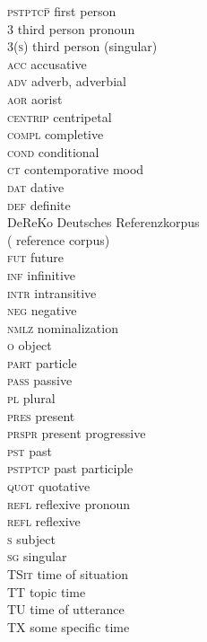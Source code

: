 \documentclass[output=paper,hidelinks]{langscibook}
\begin{document}
\begin{multicols}{2}
\begin{tabbing}
\textsc{pstptcp}\hspace{1ex}\=    \> first person \\
3 \> third person pronoun \\
3(\textsc{s}) \> third person (singular) \\
\textsc{acc} \> accusative \\
\textsc{adv}\> adverb, adverbial \\ 
\textsc{aor}\> aorist \\ 
\textsc{centrip} \> centripetal \\
\textsc{compl} \> completive\\
\textsc{cond}\> conditional\\
\textsc{ct} \> contemporative mood\\
\textsc{dat} \> dative\\
\textsc{def} \> definite\\
DeReKo\> Deutsches Referenzkorpus \\ \> ( reference corpus)\\
\textsc{fut} \> future \\
\textsc{inf} \> infinitive \\
\textsc{intr} \> intransitive\\
\textsc{neg} \> negative \\
\textsc{nmlz}\> nominalization\\
\textsc{o} \> object\\
\textsc{part}\> particle\\
\textsc{pass}\> passive\\
\textsc{pl}\> plural \\
\textsc{pres}\> present \\
\textsc{prspr} \> present progressive \\
\textsc{pst} \> past \\
\textsc{pstptcp}\> past participle\\
\textsc{quot}\> quotative\\
\textsc{refl} \> reflexive pronoun\\
\textsc{refl}\> reflexive\\
\textsc{s} \> subject \\
\textsc{sg} \> singular \\
\textsc{TSit}\> time of situation\\
\textsc{TT}\> topic time \\
\textsc{TU}\> time of utterance\\
\textsc{TX}\> some specific time
\end{tabbing}
\end{multicols}
{\sloppy\printbibliography[heading=subbibliography,notkeyword=this]}
\end{document}

